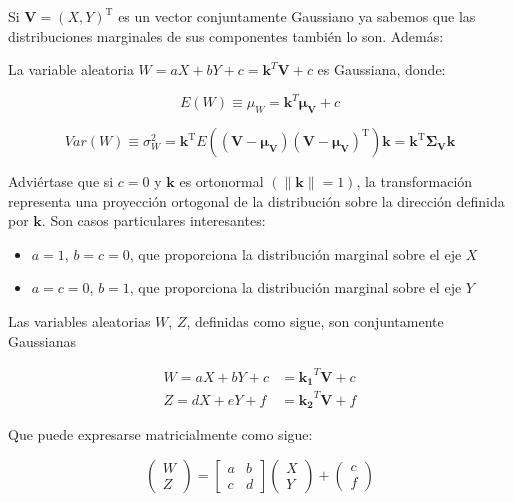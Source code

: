 \documentclass[11pt]{article}
\providecommand{\tightlist}{%
      \setlength{\itemsep}{0pt}\setlength{\parskip}{0pt}}
\begin{document}
Si \(\mathbf{V}=(X,Y)^\mathrm{T}\) es un vector conjuntamente Gaussiano
ya sabemos que las distribuciones marginales de sus componentes también
lo son. Además:

La variable aleatoria \(W = aX+bY+c = \mathbf{k}^T\mathbf{V} + c\) es
Gaussiana, donde:

\[E(W)\equiv \mu_W = \mathbf{k}^T\boldsymbol{\mu_V} + c\]

\[Var(W)\equiv \sigma_W^2 = \mathbf{k}^\mathrm{T}E\left((\mathbf{V}-\boldsymbol{\mu_V})(\mathbf{V}-\boldsymbol{\mu_V})^\mathrm{T} \right)\mathbf{k}=\mathbf{k}^\mathrm{T}\boldsymbol{\Sigma_V}\mathbf{k}\]

Adviértase que si \(c=0\) y \(\mathbf{k}\) es ortonormal
\(\left( \| \mathbf{k}\| = 1 \right)\), la transformación representa una
proyección ortogonal de la distribución sobre la dirección definida por
\(\mathbf{k}\). Son casos particulares interesantes:

\begin{itemize}
\tightlist
\item
  \(a=1\), \(b=c=0\), que proporciona la distribución marginal sobre el
  eje \(X\)
\item
  \(a=c=0\), \(b=1\), que proporciona la distribución marginal sobre el
  eje \(Y\)
\end{itemize}

    Las variables aleatorias \(W\), \(Z\), definidas como sigue, son
conjuntamente Gaussianas

\begin{align}
W = aX+bY+c &= \mathbf{k_1}^T\mathbf{V} + c\\   
Z = dX+eY+f &= \mathbf{k_2}^T\mathbf{V} + f
\end{align}

Que puede expresarse matricialmente como sigue:

\[
\left( \begin{array}{c}{W} \\ {Z}\end{array}\right) = 
\left[ \begin{array}{cc}{a} & {b} \\ {c} & {d}\end{array}\right]\left( \begin{array}{c}{X} \\ {Y}\end{array}\right) + \left( \begin{array}{c}{c} \\ {f}\end{array}\right)
\]
\end{document}
